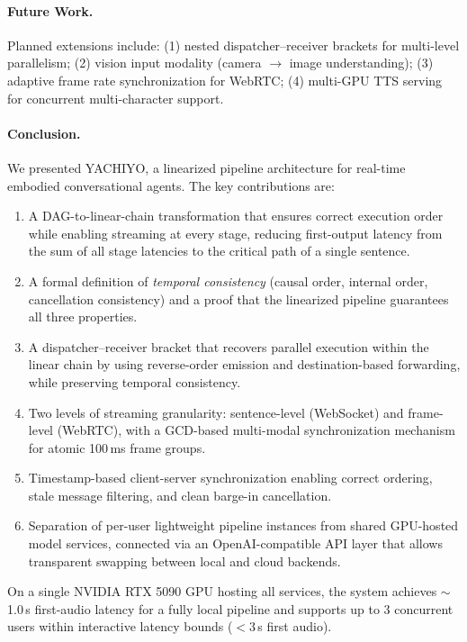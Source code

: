 \documentclass[11pt,a4paper]{article}
\begin{document}
\paragraph{Future Work.}
Planned extensions include: (1) nested dispatcher--receiver brackets for multi-level parallelism; (2) vision input modality (camera $\rightarrow$ image understanding); (3) adaptive frame rate synchronization for WebRTC; (4) multi-GPU TTS serving for concurrent multi-character support.

\paragraph{Conclusion.}
We presented YACHIYO, a linearized pipeline architecture for real-time embodied conversational agents. The key contributions are:
\begin{enumerate}[nosep]
    \item A DAG-to-linear-chain transformation that ensures correct execution order while enabling streaming at every stage, reducing first-output latency from the sum of all stage latencies to the critical path of a single sentence.
    \item A formal definition of \emph{temporal consistency} (causal order, internal order, cancellation consistency) and a proof that the linearized pipeline guarantees all three properties.
    \item A dispatcher--receiver bracket that recovers parallel execution within the linear chain by using reverse-order emission and destination-based forwarding, while preserving temporal consistency.
    \item Two levels of streaming granularity: sentence-level (WebSocket) and frame-level (WebRTC), with a GCD-based multi-modal synchronization mechanism for atomic 100\,ms frame groups.
    \item Timestamp-based client-server synchronization enabling correct ordering, stale message filtering, and clean barge-in cancellation.
    \item Separation of per-user lightweight pipeline instances from shared GPU-hosted model services, connected via an OpenAI-compatible API layer that allows transparent swapping between local and cloud backends.
\end{enumerate}

On a single NVIDIA RTX 5090 GPU hosting all services, the system achieves $\sim$1.0\,s first-audio latency for a fully local pipeline and supports up to 3 concurrent users within interactive latency bounds ($<$3\,s first audio).
\end{document}
